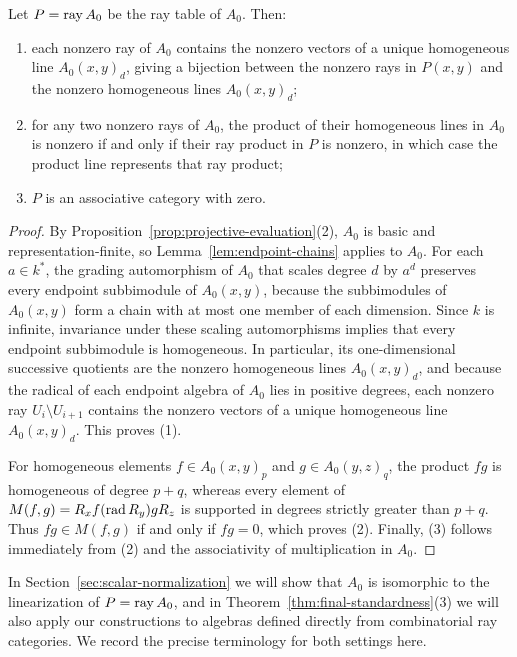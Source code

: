 \begin{proposition}
\label{prop:projective-ray-product}
Let $P=\operatorname{ray} A_0$ be the ray table of $A_0$. Then:
\begin{enumerate}[label={\upshape(\arabic*)}]
\item each nonzero ray of $A_0$ contains the nonzero vectors of a unique
homogeneous line $A_0(x,y)_d$, giving a bijection between the nonzero rays in
$P(x,y)$ and the nonzero homogeneous lines $A_0(x,y)_d$;
\item for any two nonzero rays of $A_0$, the product of their homogeneous
lines in $A_0$ is nonzero if and only if their ray product in $P$ is
nonzero, in which case the product line represents that ray product;
\item $P$ is an associative category with zero.
\end{enumerate}
\end{proposition}
\begin{proof}
By Proposition~\ref{prop:projective-evaluation}(2), $A_0$ is basic and
representation-finite, so Lemma~\ref{lem:endpoint-chains} applies to $A_0$.
For each $a\in k^*$, the grading automorphism of $A_0$ that scales degree
$d$ by $a^d$ preserves every endpoint subbimodule of $A_0(x,y)$, because the
subbimodules of $A_0(x,y)$ form a chain with at most one member of each
dimension. Since $k$ is infinite, invariance under these scaling
automorphisms implies that every endpoint subbimodule is homogeneous. In
particular, its one-dimensional successive quotients are the nonzero
homogeneous lines $A_0(x,y)_d$, and because the radical of each endpoint
algebra of $A_0$ lies in positive degrees, each nonzero ray $U_i\setminus U_{i+1}$
contains the nonzero vectors of a unique homogeneous line $A_0(x,y)_d$. This proves (1).

For homogeneous elements $f\in A_0(x,y)_p$ and $g\in A_0(y,z)_q$, the
product $fg$ is homogeneous of degree $p+q$, whereas every element of
$M(f,g)=R_x f(\operatorname{rad} R_y)g R_z$ is supported in degrees strictly greater than
$p+q$. Thus $fg\in M(f,g)$ if and only if $fg=0$, which proves (2).
Finally, (3) follows immediately from (2) and the associativity of
multiplication in $A_0$.
\end{proof}

In Section~\ref{sec:scalar-normalization} we will show that $A_0$ is
isomorphic to the linearization of $P=\operatorname{ray} A_0$, and in
Theorem~\ref{thm:final-standardness}(3) we will also apply our constructions
to algebras defined directly from combinatorial ray categories. We record the
precise terminology for both settings here.

